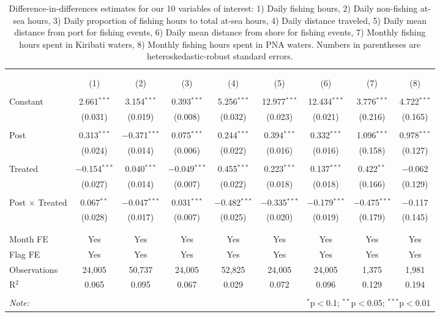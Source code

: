 
\begin{table}[!htbp] \centering 
  \caption{\label{tab:main_DID}Difference-in-differences estimates for our 10 variables of interest: 1) Daily fishing hours, 2) Daily non-fishing at-sea hours, 3) Daily proportion of fishing hours to total at-sea hours, 4) Daily distance traveled, 5) Daily mean distance from port for fishing events, 6) Daily mean distance from shore for fishing events, 7) Monthly fishing hours spent in Kiribati waters, 8) Monthly fishing hours spent in PNA waters. Numbers in parentheses are heteroskedastic-robust standard errors.} 
  \label{} 
\footnotesize 
\begin{tabular}{@{\extracolsep{1pt}}lcccccccc} 
\\[-1.8ex]\hline 
\hline \\[-1.8ex] 
\\[-1.8ex] & (1) & (2) & (3) & (4) & (5) & (6) & (7) & (8)\\ 
\hline \\[-1.8ex] 
 Constant & 2.661$^{***}$ & 3.154$^{***}$ & 0.393$^{***}$ & 5.256$^{***}$ & 12.977$^{***}$ & 12.434$^{***}$ & 3.776$^{***}$ & 4.722$^{***}$ \\ 
  & (0.031) & (0.019) & (0.008) & (0.032) & (0.023) & (0.021) & (0.216) & (0.165) \\ 
  & & & & & & & & \\ 
 Post & 0.313$^{***}$ & $-$0.371$^{***}$ & 0.075$^{***}$ & 0.244$^{***}$ & 0.394$^{***}$ & 0.332$^{***}$ & 1.096$^{***}$ & 0.978$^{***}$ \\ 
  & (0.024) & (0.014) & (0.006) & (0.022) & (0.016) & (0.016) & (0.158) & (0.127) \\ 
  & & & & & & & & \\ 
 Treated & $-$0.154$^{***}$ & 0.040$^{***}$ & $-$0.049$^{***}$ & 0.455$^{***}$ & 0.223$^{***}$ & 0.137$^{***}$ & 0.422$^{**}$ & $-$0.062 \\ 
  & (0.027) & (0.014) & (0.007) & (0.022) & (0.018) & (0.018) & (0.166) & (0.129) \\ 
  & & & & & & & & \\ 
 Post $\times$ Treated & 0.067$^{**}$ & $-$0.047$^{***}$ & 0.031$^{***}$ & $-$0.482$^{***}$ & $-$0.335$^{***}$ & $-$0.179$^{***}$ & $-$0.475$^{***}$ & $-$0.117 \\ 
  & (0.028) & (0.017) & (0.007) & (0.025) & (0.020) & (0.019) & (0.179) & (0.145) \\ 
  & & & & & & & & \\ 
\hline \\[-1.8ex] 
Month FE & Yes & Yes & Yes & Yes & Yes & Yes & Yes & Yes \\ 
Flag FE & Yes & Yes & Yes & Yes & Yes & Yes & Yes & Yes \\ 
Observations & 24,005 & 50,737 & 24,005 & 52,825 & 24,005 & 24,005 & 1,375 & 1,981 \\ 
R$^{2}$ & 0.065 & 0.095 & 0.067 & 0.029 & 0.072 & 0.096 & 0.129 & 0.194 \\ 
\hline 
\hline \\[-1.8ex] 
\textit{Note:}  & \multicolumn{8}{r}{$^{*}$p$<$0.1; $^{**}$p$<$0.05; $^{***}$p$<$0.01} \\ 
\end{tabular} 
\end{table} 
